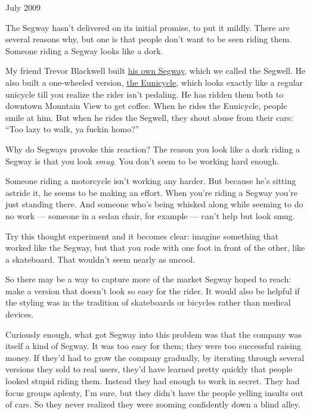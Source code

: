 July 2009

The Segway hasn't delivered on its initial promise, to put it mildly.
There are several reasons why, but one is that people don't want to be
seen riding them. Someone riding a Segway looks like a dork.

My friend Trevor Blackwell built \href{http://tlb.org/\#scooter}{his own
Segway}, which we called the Segwell. He also built a one-wheeled
version, \href{http://tlb.org/\#eunicycle}{the Eunicycle}, which looks
exactly like a regular unicycle till you realize the rider isn't
pedaling. He has ridden them both to downtown Mountain View to get
coffee. When he rides the Eunicycle, people smile at him. But when he
rides the Segwell, they shout abuse from their cars: ``Too lazy to walk,
ya fuckin homo?''

Why do Segways provoke this reaction? The reason you look like a dork
riding a Segway is that you look \emph{smug}. You don't seem to be
working hard enough.

Someone riding a motorcycle isn't working any harder. But because he's
sitting astride it, he seems to be making an effort. When you're riding
a Segway you're just standing there. And someone who's being whisked
along while seeming to do no work --- someone in a sedan chair, for
example --- can't help but look smug.

Try this thought experiment and it becomes clear: imagine something that
worked like the Segway, but that you rode with one foot in front of the
other, like a skateboard. That wouldn't seem nearly as uncool.

So there may be a way to capture more of the market Segway hoped to
reach: make a version that doesn't look so easy for the rider. It would
also be helpful if the styling was in the tradition of skateboards or
bicycles rather than medical devices.

Curiously enough, what got Segway into this problem was that the company
was itself a kind of Segway. It was too easy for them; they were too
successful raising money. If they'd had to grow the company gradually,
by iterating through several versions they sold to real users, they'd
have learned pretty quickly that people looked stupid riding them.
Instead they had enough to work in secret. They had focus groups
aplenty, I'm sure, but they didn't have the people yelling insults out
of cars. So they never realized they were zooming confidently down a
blind alley.
